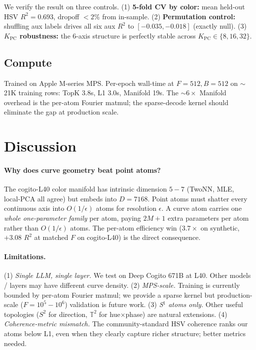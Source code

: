 \documentclass[10pt,twocolumn]{article}
\begin{document}
We verify the result on three controls. (1) \textbf{5-fold CV by color:} mean
held-out HSV $R^2 = 0.693$, dropoff $<2$\% from in-sample. (2) \textbf{Permutation
control:} shuffling aux labels drives all six aux $R^2$ to $[-0.035, -0.018]$
(exactly null). (3) \textbf{$K_{\text{PC}}$ robustness:} the 6-axis structure
is perfectly stable across $K_{\text{PC}} \in \{8, 16, 32\}$.

\subsection{Compute}

Trained on Apple M-series MPS. Per-epoch wall-time at $F{=}512, B{=}512$ on
$\sim$21K training rows: TopK 3.8s, L1 3.0s, Manifold 19s. The $\sim 6\times$
Manifold overhead is the per-atom Fourier matmul; the sparse-decode kernel
should eliminate the gap at production scale.

\section{Discussion}
\label{sec:discussion}

\paragraph{Why does curve geometry beat point atoms?} The cogito-L40 color
manifold has intrinsic dimension $5{-}7$ (TwoNN, MLE, local-PCA all agree) but
embeds into $D{=}7168$. Point atoms must shatter every continuous axis into
$O(1/\epsilon)$ atoms for resolution $\epsilon$. A curve atom carries one
\emph{whole one-parameter family} per atom, paying $2M{+}1$ extra parameters
per atom rather than $O(1/\epsilon)$ atoms. The per-atom efficiency win
($3.7\times$ on synthetic, $+3.08$ $R^2$ at matched $F$ on cogito-L40) is the
direct consequence.

\paragraph{Limitations.}
(1) \emph{Single LLM, single layer.} We test on Deep Cogito 671B at L40.
Other models / layers may have different curve density. (2) \emph{MPS-scale.}
Training is currently bounded by per-atom Fourier matmul; we provide a sparse
kernel but production-scale ($F{=}10^5{-}10^6$) validation is future work.
(3) \emph{S$^1$ atoms only.} Other useful topologies ($S^2$ for direction,
$\mathbb{T}^2$ for hue$\times$phase) are natural extensions.
(4) \emph{Coherence-metric mismatch.} The community-standard HSV coherence
ranks our atoms below L1, even when they clearly capture richer structure;
better metrics needed.
\end{document}

